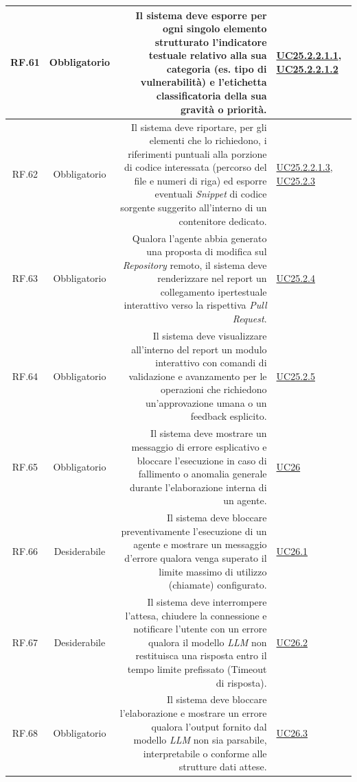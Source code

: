 \documentclass[12pt, a4paper]{article}
\begin{document}
\begin{xltabular}{\textwidth}{|c|c|D|F|}
    RF.61 & Obbligatorio & Il sistema deve esporre per ogni singolo elemento strutturato l'indicatore testuale relativo alla sua categoria (es. tipo di vulnerabilità) e l'etichetta classificatoria della sua gravità o priorità. & \hyperref[uc:25.2.2.1.1]{UC25.2.2.1.1}, \hyperref[uc:25.2.2.1.2]{UC25.2.2.1.2} \\ \hline
    
    RF.62 & Obbligatorio & Il sistema deve riportare, per gli elementi che lo richiedono, i riferimenti puntuali alla porzione di codice interessata (percorso del file e numeri di riga) ed esporre eventuali \textit{Snippet} di codice sorgente suggerito all'interno di un contenitore dedicato. & \hyperref[uc:25.2.2.1.3]{UC25.2.2.1.3}, \hyperref[uc:25.2.3]{UC25.2.3} \\ \hline
    
    RF.63 & Obbligatorio & Qualora l'agente abbia generato una proposta di modifica sul \textit{Repository} remoto, il sistema deve renderizzare nel report un collegamento ipertestuale interattivo verso la rispettiva \textit{Pull Request}. & \hyperref[uc:25.2.4]{UC25.2.4} \\ \hline
    
    RF.64 & Obbligatorio & Il sistema deve visualizzare all'interno del report un modulo interattivo con comandi di validazione e avanzamento per le operazioni che richiedono un'approvazione umana o un feedback esplicito. & \hyperref[uc:25.2.5]{UC25.2.5} \\ \hline
    
    RF.65 & Obbligatorio & Il sistema deve mostrare un messaggio di errore esplicativo e bloccare l'esecuzione in caso di fallimento o anomalia generale durante l'elaborazione interna di un agente. & \hyperref[uc:26]{UC26} \\ \hline
    
    RF.66 & Desiderabile & Il sistema deve bloccare preventivamente l'esecuzione di un agente e mostrare un messaggio d'errore qualora venga superato il limite massimo di utilizzo (chiamate) configurato. & \hyperref[uc:26.1]{UC26.1} \\ \hline
    
    RF.67 & Desiderabile & Il sistema deve interrompere l'attesa, chiudere la connessione e notificare l'utente con un errore qualora il modello \textit{LLM} non restituisca una risposta entro il tempo limite prefissato (Timeout di risposta). & \hyperref[uc:26.2]{UC26.2} \\ \hline
    
    RF.68 & Obbligatorio & Il sistema deve bloccare l'elaborazione e mostrare un errore qualora l'output fornito dal modello \textit{LLM} non sia parsabile, interpretabile o conforme alle strutture dati attese. & \hyperref[uc:26.3]{UC26.3} \\ \hline
    

\end{xltabular}
\end{document}
